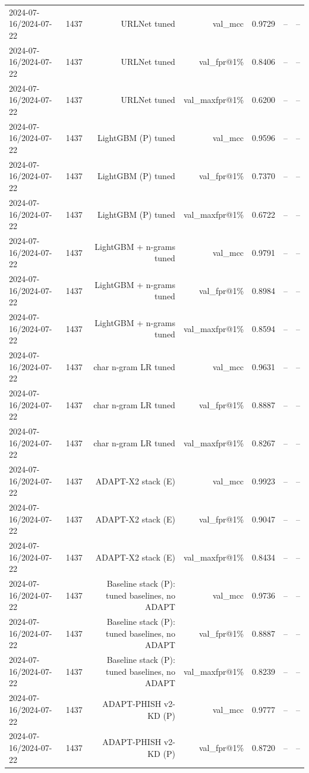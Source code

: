 \begin{table}[t]
\begin{tabular}{llrrrrr}
2024-07-16/2024-07-22 & 1437 & URLNet tuned & val\_mcc & 0.9729 & -- & -- \\
2024-07-16/2024-07-22 & 1437 & URLNet tuned & val\_fpr@1\% & 0.8406 & -- & -- \\
2024-07-16/2024-07-22 & 1437 & URLNet tuned & val\_maxfpr@1\% & 0.6200 & -- & -- \\
2024-07-16/2024-07-22 & 1437 & LightGBM (P) tuned & val\_mcc & 0.9596 & -- & -- \\
2024-07-16/2024-07-22 & 1437 & LightGBM (P) tuned & val\_fpr@1\% & 0.7370 & -- & -- \\
2024-07-16/2024-07-22 & 1437 & LightGBM (P) tuned & val\_maxfpr@1\% & 0.6722 & -- & -- \\
2024-07-16/2024-07-22 & 1437 & LightGBM + n-grams tuned & val\_mcc & 0.9791 & -- & -- \\
2024-07-16/2024-07-22 & 1437 & LightGBM + n-grams tuned & val\_fpr@1\% & 0.8984 & -- & -- \\
2024-07-16/2024-07-22 & 1437 & LightGBM + n-grams tuned & val\_maxfpr@1\% & 0.8594 & -- & -- \\
2024-07-16/2024-07-22 & 1437 & char n-gram LR tuned & val\_mcc & 0.9631 & -- & -- \\
2024-07-16/2024-07-22 & 1437 & char n-gram LR tuned & val\_fpr@1\% & 0.8887 & -- & -- \\
2024-07-16/2024-07-22 & 1437 & char n-gram LR tuned & val\_maxfpr@1\% & 0.8267 & -- & -- \\
2024-07-16/2024-07-22 & 1437 & ADAPT-X2 stack (E) & val\_mcc & 0.9923 & -- & -- \\
2024-07-16/2024-07-22 & 1437 & ADAPT-X2 stack (E) & val\_fpr@1\% & 0.9047 & -- & -- \\
2024-07-16/2024-07-22 & 1437 & ADAPT-X2 stack (E) & val\_maxfpr@1\% & 0.8434 & -- & -- \\
2024-07-16/2024-07-22 & 1437 & Baseline stack (P): tuned baselines, no ADAPT & val\_mcc & 0.9736 & -- & -- \\
2024-07-16/2024-07-22 & 1437 & Baseline stack (P): tuned baselines, no ADAPT & val\_fpr@1\% & 0.8887 & -- & -- \\
2024-07-16/2024-07-22 & 1437 & Baseline stack (P): tuned baselines, no ADAPT & val\_maxfpr@1\% & 0.8239 & -- & -- \\
2024-07-16/2024-07-22 & 1437 & ADAPT-PHISH v2-KD (P) & val\_mcc & 0.9777 & -- & -- \\
2024-07-16/2024-07-22 & 1437 & ADAPT-PHISH v2-KD (P) & val\_fpr@1\% & 0.8720 & -- & -- \\

\end{tabular}
\end{table}
